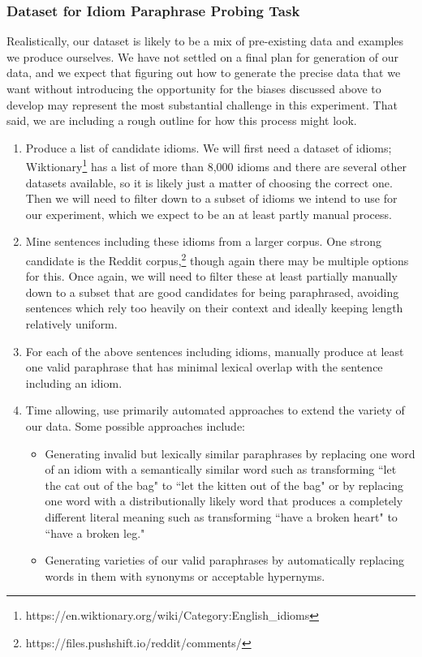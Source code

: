 \documentclass[11pt,a4paper]{article}
\begin{document}
\subsubsection{Dataset for Idiom Paraphrase Probing Task}
Realistically, our dataset is likely to be a mix of pre-existing data and examples we produce ourselves. We have not settled on a final plan for generation of our data, and we expect that figuring out how to generate the precise data that we want without introducing the opportunity for the biases discussed above to develop may represent the most substantial challenge in this experiment. That said, we are including a rough outline for how this process might look. 

\begin{enumerate}
    \item Produce a list of candidate idioms. We will first need a dataset of idioms; Wiktionary\footnote{https://en.wiktionary.org/wiki/Category:English\_idioms} has a list of more than 8,000 idioms and there are several other datasets available, so it is likely just a matter of choosing the correct one. Then we will need to filter down to a subset of idioms we intend to use for our experiment, which we expect to be an at least partly manual process.
    \item Mine sentences including these idioms from a larger corpus. One strong candidate is the Reddit corpus,\footnote{https://files.pushshift.io/reddit/comments/} though again there may be multiple options for this. Once again, we will need to filter these at least partially manually down to a subset that are good candidates for being paraphrased, avoiding sentences which rely too heavily on their context and ideally keeping length relatively uniform.
    \item For each of the above sentences including idioms, manually produce at least one valid paraphrase that has minimal lexical overlap with the sentence including an idiom. 
    \item Time allowing, use primarily automated approaches to extend the variety of our data. Some possible approaches include:
    \begin{itemize}
        \item Generating invalid but lexically similar paraphrases by replacing one word of an idiom  with a semantically similar word such as transforming ``let the cat out of the bag" to ``let the kitten out of the bag" or by replacing one word with a distributionally likely word that produces a completely different literal meaning such as transforming ``have a broken heart" to ``have a broken leg."
        \item Generating varieties of our valid paraphrases by automatically replacing words in them with synonyms or acceptable hypernyms. 
    \end{itemize}

\end{enumerate}
\end{document}
